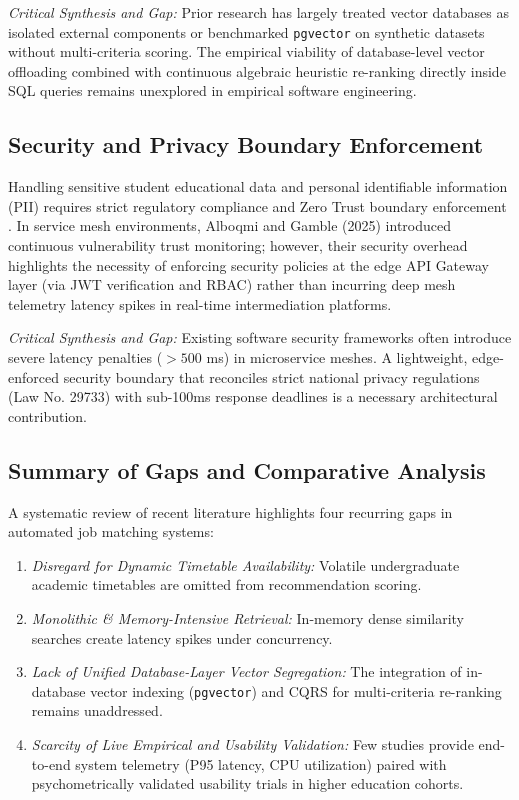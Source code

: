 \documentclass[a4paper,fleqn]{cas-dc}
\begin{document}
\medskip\noindent\textit{Critical Synthesis and Gap:} Prior research has largely treated vector databases as isolated external components or benchmarked \texttt{pgvector} on synthetic datasets without multi-criteria scoring. The empirical viability of database-level vector offloading combined with continuous algebraic heuristic re-ranking directly inside SQL queries remains unexplored in empirical software engineering.

\subsection{Security and Privacy Boundary Enforcement}
Handling sensitive student educational data and personal identifiable information (PII) requires strict regulatory compliance \cite{ley29733, dl1270} and Zero Trust boundary enforcement \cite{alboqmi2025}. In service mesh environments, Alboqmi and Gamble (2025) \cite{alboqmi2025} introduced continuous vulnerability trust monitoring; however, their security overhead highlights the necessity of enforcing security policies at the edge API Gateway layer (via JWT verification and RBAC) rather than incurring deep mesh telemetry latency spikes in real-time intermediation platforms.

\medskip\noindent\textit{Critical Synthesis and Gap:} Existing software security frameworks often introduce severe latency penalties ($>500$ ms) in microservice meshes. A lightweight, edge-enforced security boundary that reconciles strict national privacy regulations (Law No. 29733) with sub-100ms response deadlines is a necessary architectural contribution.

\subsection{Summary of Gaps and Comparative Analysis}
A systematic review of recent literature highlights four recurring gaps in automated job matching systems:
\begin{enumerate}
    \item \textit{Disregard for Dynamic Timetable Availability:} Volatile undergraduate academic timetables are omitted from recommendation scoring.
    \item \textit{Monolithic \& Memory-Intensive Retrieval:} In-memory dense similarity searches create latency spikes under concurrency.
    \item \textit{Lack of Unified Database-Layer Vector Segregation:} The integration of in-database vector indexing (\texttt{pgvector}) and CQRS for multi-criteria re-ranking remains unaddressed.
    \item \textit{Scarcity of Live Empirical and Usability Validation:} Few studies provide end-to-end system telemetry (P95 latency, CPU utilization) paired with psychometrically validated usability trials in higher education cohorts.
\end{enumerate}
\end{document}
